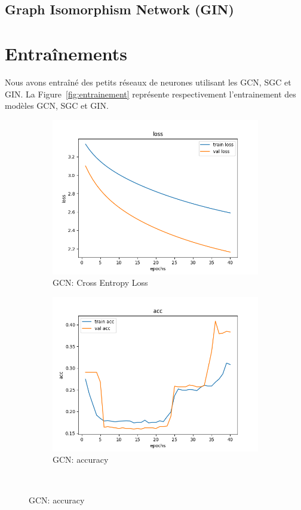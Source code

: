 \documentclass[a4paper]{article}
\begin{document}
\subsection{Graph Isomorphism Network (GIN)}

\section{Entraînements}

Nous avons entraîné des petits réseaux de neurones utilisant les GCN, SGC et GIN. La
Figure~\ref{fig:entrainement} représente respectivement l'entrainement des modèles 
GCN, SGC et GIN.


\begin{figure}[ht]
    \centering
    \begin{subfigure}{0.47\textwidth}
      \includegraphics[width=\linewidth]{../results/GCN_0/loss.png}
      \caption{GCN: Cross Entropy Loss}
    \end{subfigure}
    \hfill
    \begin{subfigure}{0.47\textwidth}
      \includegraphics[width=\linewidth]{../results/GCN_0/acc.png}
      \caption{GCN: accuracy}
    \end{subfigure}\\


\end{figure}
\end{document}
